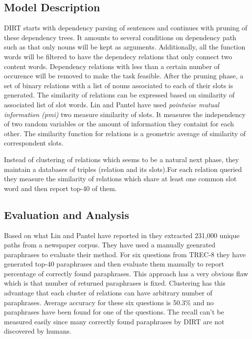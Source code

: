 \documentclass[12pt]{report}
\begin{document}
\subsection{Model Description}
\label{ch:model} 
DIRT starts with dependency parsing of sentences and continues with pruning of these dependency trees.
It amounts to several conditions on dependency path such as that only nouns will be kept as arguments. 
Additionally, all the function words will be filtered to have the dependecy relations that only connect
two content words. Dependency relations with less than a certain number of occurence will be removed to make the task feasible.
After the pruning phase, a set of binary relations with a list of nouns associated to each of their slots is generated. 
The similarity of relations can be expressed based on similarity of associated list of slot words. Lin and Pantel
have used \emph{pointwise mutual information (pmi)} two measure similarity of slots. 
It measures the independency of two random variables or the amount of
information they containt for each other. The similarity function for relations  is a geometric average
of similarity of correspondent slots.

Instead of clustering of relations which seems to be a natural next phase,
 they maintain a databases of triples (relation and its slots).For each relation queried
  they measure the similarity of relations which share at least one common slot word and then report top-40 of them.
  
\subsection{Evaluation and Analysis}
\label{ch:model} 
  
  Based on what Lin and Pantel have reported in \cite{Lin2001} they extracted 231,000 unique paths from a newspaper corpus.
  They have used a manually geenrated paraphrases to evaluate their method. For six questions from TREC-8 
  they have generated top-40 paraphrases and then evaluate them manually to report percentage of correctly found paraphrases.
  This approach has a very obvious flaw which is that number of returned paraphrases is fixed. Clustering has this 
  advantage that each cluster of relations can have arbitrary number of paraphrases.
  Average accuracy for these six questions is 50.3\% and no paraphrases have been found for one of the questions.
  The recall can't be measured easily since many correctly found paraphrases by DIRT are not discovered by humans.
  
\end{document}
